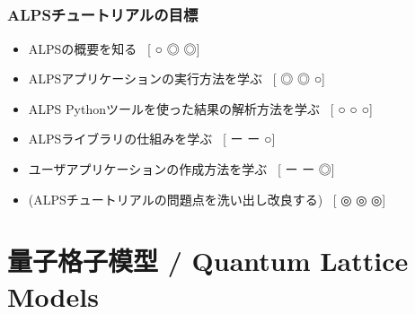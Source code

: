 \subsection*{\redb\whiteb\greenb}
\begin{frame}[t,fragile]
  \frametitle{ALPSチュートリアルの目標}
  \begin{itemize}
    \setlength{\itemsep}{1em}
    \item ALPSの概要を知る \ [{\footnotesize\color{red} ○}{\footnotesize\color{blue} ◎}{\footnotesize\color{green} ◎}]
    \item ALPSアプリケーションの実行方法を学ぶ  \ [{\footnotesize\color{red} ◎}{\footnotesize\color{blue} ◎}{\footnotesize\color{green} ○}]
    \item ALPS Pythonツールを使った結果の解析方法を学ぶ  \ [{\footnotesize\color{red} ○}{\footnotesize\color{blue} ○}{\footnotesize\color{green} ○}]
    \item ALPSライブラリの仕組みを学ぶ \ [{\footnotesize\color{red} ー}{\footnotesize\color{blue} ー}{\footnotesize\color{green} ○}]
    \item ユーザアプリケーションの作成方法を学ぶ \ [{\footnotesize\color{red} ー}{\footnotesize\color{blue} ー}{\footnotesize\color{green} ◎}]
    \item (ALPSチュートリアルの問題点を洗い出し改良する) \ [{\footnotesize\color{red} ◎}{\footnotesize\color{blue} ◎}{\footnotesize\color{green} ◎}] 
  \end{itemize}
\end{frame}

\section{量子格子模型 / Quantum Lattice Models}

